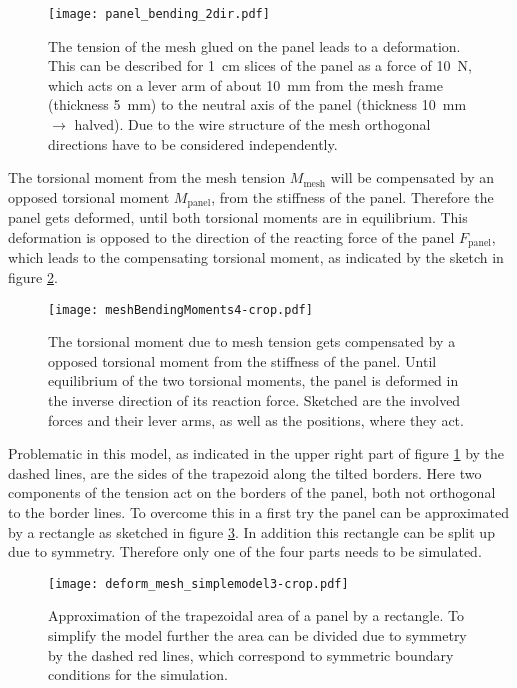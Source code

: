 \documentclass[
a4paper,                                %
twoside,                                %
BCOR1.4cm,                      %
10pt,                           %
headings=normal,                %
headsepline,                    %
clearplainpage, %
final,                                  %
div=14,
parskip=full,
openright,
bibliography=toc
]{scrreprt}
\begin{document}
\begin{figure}[H]
	\centering
	\texttt{[image: panel\_bending\_2dir.pdf]}
	\caption{The tension of the mesh glued on the panel leads to a deformation. This can be described for \SI{1}{\cm} slices of the panel as a force of \SI{10}{\N}, which acts on a lever arm of about \SI{10}{\mm} from the mesh frame (thickness \SI{5}{\mm}) to the neutral axis of the panel (thickness \SI{10}{\mm} $\rightarrow$ halved). Due to the wire structure of the mesh orthogonal directions have to be considered independently.}
	\label{panelBendingSketch}
\end{figure}

The torsional moment from the mesh tension $M_{\mathrm{mesh}}$ will be compensated by an opposed torsional moment $M_{\mathrm{panel}}$, from the stiffness of the panel. Therefore the panel gets deformed, until both torsional moments are in equilibrium. This deformation is opposed to the direction of the reacting force of the panel $F_{\mathrm{panel}}$, which leads to the compensating torsional moment, as indicated by the sketch in figure \ref{bendingMoments}. 

\begin{figure}[H]
	\centering
	\texttt{[image: meshBendingMoments4-crop.pdf]}
	\caption{The torsional moment due to mesh tension gets compensated by a opposed torsional moment from the stiffness of the panel. Until equilibrium of the two torsional moments, the panel is deformed in the inverse direction of its reaction force. Sketched are the involved forces and their lever arms, as well as the positions, where they act.}
	\label{bendingMoments}
\end{figure}

Problematic in this model, as indicated in the upper right part of figure \ref{panelBendingSketch} by the dashed lines, are the sides of the trapezoid along the tilted borders. Here two components of the tension act on the borders of the panel, both not orthogonal to the border lines. To overcome this in a first try the panel can be approximated by a rectangle as sketched in figure \ref{panelSimplifaction}. In addition this rectangle can be split up due to symmetry.  Therefore only one of the four parts needs to be simulated.\cite{elias}

\begin{figure}[H]
	\centering
	\texttt{[image: deform\_mesh\_simplemodel3-crop.pdf]}
	\caption{Approximation of the trapezoidal area of a panel by a rectangle. To simplify the model further the area can be divided due to symmetry by the dashed red lines, which correspond to symmetric boundary conditions for the simulation.}
	\label{panelSimplifaction}
\end{figure}
\end{document}
